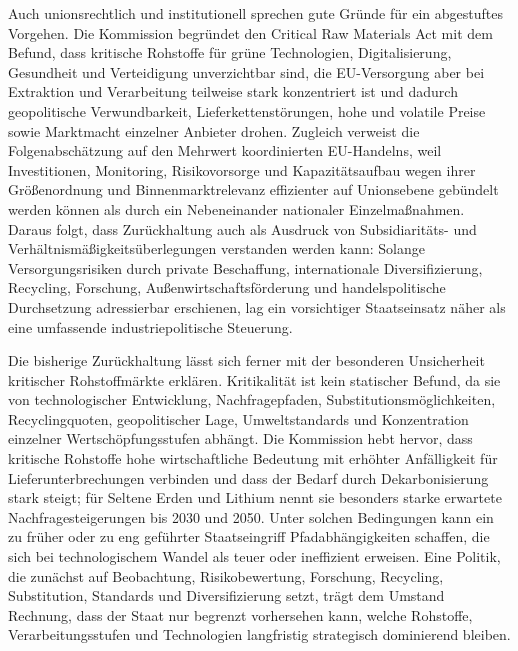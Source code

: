 \documentclass[12pt,a4paper,oneside]{book} %
\begin{document}
{Auch unionsrechtlich und institutionell sprechen gute Gründe für ein abgestuftes Vorgehen. Die Kommission begründet den Critical Raw Materials Act mit dem Befund, dass kritische Rohstoffe für grüne Technologien, Digitalisierung, Gesundheit und Verteidigung unverzichtbar sind, die EU-Versorgung aber bei Extraktion und Verarbeitung teilweise stark konzentriert ist und dadurch geopolitische Verwundbarkeit, Lieferkettenstörungen, hohe und volatile Preise sowie Marktmacht einzelner Anbieter drohen. Zugleich verweist die Folgenabschätzung auf den Mehrwert koordinierten EU-Handelns, weil Investitionen, Monitoring, Risikovorsorge und Kapazitätsaufbau wegen ihrer Größenordnung und Binnenmarktrelevanz effizienter auf Unionsebene gebündelt werden können als durch ein Nebeneinander nationaler Einzelmaßnahmen. Daraus folgt, dass Zurückhaltung auch als Ausdruck von Subsidiaritäts- und Verhältnismäßigkeitsüberlegungen verstanden werden kann: Solange Versorgungsrisiken durch private Beschaffung, internationale Diversifizierung, Recycling, Forschung, Außenwirtschaftsförderung und handelspolitische Durchsetzung adressierbar erschienen, lag ein vorsichtiger Staatseinsatz näher als eine umfassende industriepolitische Steuerung.

Die bisherige Zurückhaltung lässt sich ferner mit der besonderen Unsicherheit kritischer Rohstoffmärkte erklären. Kritikalität ist kein statischer Befund, da sie von technologischer Entwicklung, Nachfragepfaden, Substitutionsmöglichkeiten, Recyclingquoten, geopolitischer Lage, Umweltstandards und Konzentration einzelner Wertschöpfungsstufen abhängt. Die Kommission hebt hervor, dass kritische Rohstoffe hohe wirtschaftliche Bedeutung mit erhöhter Anfälligkeit für Lieferunterbrechungen verbinden und dass der Bedarf durch Dekarbonisierung stark steigt; für Seltene Erden und Lithium nennt sie besonders starke erwartete Nachfragesteigerungen bis 2030 und 2050. Unter solchen Bedingungen kann ein zu früher oder zu eng geführter Staatseingriff Pfadabhängigkeiten schaffen, die sich bei technologischem Wandel als teuer oder ineffizient erweisen. Eine Politik, die zunächst auf Beobachtung, Risikobewertung, Forschung, Recycling, Substitution, Standards und Diversifizierung setzt, trägt dem Umstand Rechnung, dass der Staat nur begrenzt vorhersehen kann, welche Rohstoffe, Verarbeitungsstufen und Technologien langfristig strategisch dominierend bleiben.

}
\end{document}
